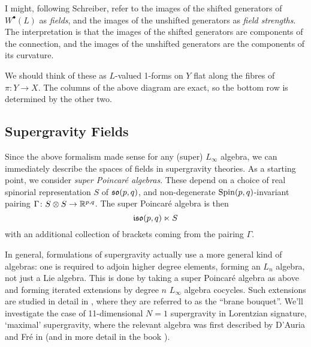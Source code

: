 \documentclass[10pt, oneside]{article}
\begin{document}
\begin{remark}
I might, following Schreiber, refer to the images of the shifted generators of $W^\bullet(L)$ as \emph{fields}, and the images of the unshifted generators as \emph{field strengths}.  The interpretation is that the images of the shifted generators are components of the connection, and the images of the unshifted generators are the components of its curvature.
\end{remark}


We should think of these as $L$-valued 1-forms on $Y$ flat along the fibres of $\pi \colon Y \to X$.  The columns of the above diagram are exact, so the bottom row is determined by the other two.

\subsection{Supergravity Fields}
Since the above formalism made sense for any (super) $L_\infty$ algebra, we can immediately describe the spaces of fields in supergravity theories.  As a starting point, we consider \emph{super Poincar\'e algebras}.  These depend on a choice of real spinorial representation $S$ of $\mathfrak{so}(p,q)$, and non-degenerate $\mathrm{Spin}(p,q)$-invariant pairing $\Gamma \colon S \otimes S \to \mathbb{R}^{p,q}$.  The super Poincar\'e algebra is then 
\[\mathfrak{iso}(p,q) \ltimes S\]
with an additional collection of brackets coming from the pairing $\Gamma$.

In general, formulations of supergravity actually use a more general kind of algebras: one is required to adjoin higher degree elements, forming an $L_n$ algebra, not just a Lie algebra.  This is done by taking a super Poincar\'e algebra as above and forming iterated extensions by degree $n$ $L_\infty$ algebra cocycles.  Such extensions are studied in detail in \cite{FSS}, where they are referred to as the ``brane bouquet''.  We'll investigate the case of 11-dimensional $N=1$ supergravity in Lorentzian signature, `maximal' supergravity, where the relevant algebra was first described by D'Auria and Fr\'e in \cite{DF} (and in more detail in the book \cite{CDF}).
\end{document}
